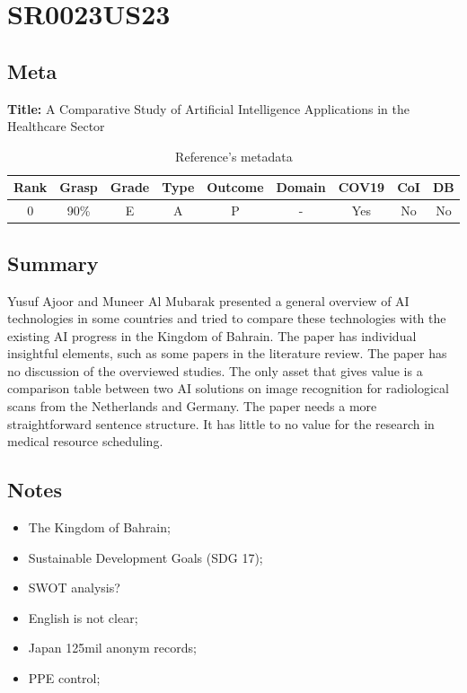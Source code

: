 \section{ SR0023US23 }


\subsection{Meta}

    \textbf{Title:}
    A Comparative Study of Artificial Intelligence Applications in the Healthcare Sector

    \begin{table}[H]
        \centering
        \begin{tabular}{|c|c|c|c|c|c|c|c|c|}
            \hline
                \textbf{Rank} & \textbf{Grasp} & \textbf{Grade} & \textbf{Type} & \textbf{Outcome} & \textbf{Domain} & \textbf{COV19} & \textbf{CoI} & \textbf{DB} \\
            \hline
                0 & 90\% & E & A & P & - & Yes & No & No \\
            \hline
        \end{tabular}
        \caption{Reference's metadata}
        \label{tab:SR0023US23}
    \end{table}

\subsection{Summary}
    Yusuf Ajoor and Muneer Al Mubarak \cite{x101} presented a general overview of AI technologies in some countries and tried to compare these technologies with the existing AI progress in the Kingdom of Bahrain. The paper has individual insightful elements, such as some papers in the literature review. The paper has no discussion of the overviewed studies. The only asset that gives value is a comparison table between two AI solutions on image recognition for radiological scans from the Netherlands and Germany. The paper needs a more straightforward sentence structure. It has little to no value for the research in medical resource scheduling.

\subsection{Notes}
    \begin{itemize}
        \item The Kingdom of Bahrain;
        \item Sustainable Development Goals (SDG 17);
        \item SWOT analysis?
        \item English is not clear;
        \item Japan 125mil anonym records;
        \item PPE control;
    \end{itemize}


